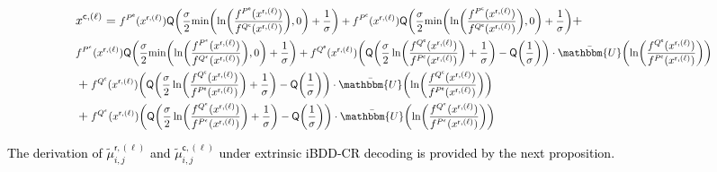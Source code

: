 \documentclass[journal]{IEEEtran}
\newcommand{\mep}{{x}}
\newcommand{\row}{\mathsf{r}}
\newcommand{\col}{\mathsf{c}}
\newcommand{\Q}{\mathsf{Q}}
\newcommand{\mut}{\tilde{\mu}}
\newcommand{\Pue}{P^{\mathsf{e}}}
\newcommand{\Que}{Q^{\mathsf{e}}}
\newcommand{\Puc}{P^{\mathsf{c}}}
\newcommand{\Quc}{Q^{\mathsf{c}}}
\newcommand{\Puep}{P^{\mathsf{\epsilon}}}
\newcommand{\Quep}{Q^{\mathsf{\epsilon}}}
\newcommand{\opt}{\tilde{l}}
\newcommand{\GL}{\textcolor{black}}
\newcommand{\GLC}[1]{\textcolor{black}{\textbf{\textit{#1}}}}
\let\originalleft\left
\let\originalright\right
\renewcommand{\left}{\mathopen{}\mathclose\bgroup\originalleft}
\renewcommand{\right}{\aftergroup\egroup\originalright}
\newcommand\scalemath[2]{\scalebox{#1}{\mbox{\ensuremath{\displaystyle #2}}}}   %
\begin{document}
\begin{figure*}[t]
	\vspace*{-20pt}
	\hrulefill		
	\begin{align}\label{xcl}
	& \nonumber \mep^{\col,(\ell)}  = \scalemath{0.85}{f^{\Pue}(\mep^{\row,(\ell)}){\Q\left( { \frac{\sigma}{2}\text{min}\left(\ln \left( \frac{f^{\Pue}(\mep^{\row,(\ell)})}{f^{\Quc}(\mep^{\row,(\ell)})}\right),0\right)+\frac{1}{\sigma}} \right) } + f^{\Puc}(\mep^{\row,(\ell)}){\Q\left( { \frac{\sigma}{2}\text{min}\left(\ln \left( \frac{f^{\Puc}(\mep^{\row,(\ell)})}{f^{\Que}(\mep^{\row,(\ell)})}\right),0\right)+\frac{1}{\sigma}} \right) }} + \\ \nonumber &  \scalemath{0.85}{f^{\Puep}(\mep^{\row,(\ell)}){\Q\left( { \frac{\sigma}{2}\text{min}\left(\ln \left(\frac{f^{\Puep}(\mep^{\row,(\ell)})}{f^{\Quep}(\mep^{\row,(\ell)})}\right),0\right)+\frac{1}{\sigma}} \right) } + f^{\Que}(\mep^{\row,(\ell)})\left( {\Q\left( { \frac{\sigma}{2}\ln \left(\frac{f^{\Que}(\mep^{\row,(\ell)})}{f^{\Puc}(\mep^{\row,(\ell)})}\right)+\frac{1}{\sigma}} \right)}-\Q\left(\frac{1}{\sigma}\right) \right) \cdot \bar{\mathbbm{U}} \left( \ln \left(\frac{f^{\Que}(\mep^{\row,(\ell)})}{f^{\Puc}(\mep^{\row,(\ell)})}\right) \right)} \\ \nonumber & + \scalemath{0.85}{f^{\Quc}(\mep^{\row,(\ell)})\left( {\Q\left( { \frac{\sigma}{2}\ln \left(\frac{f^{\Quc}(\mep^{\row,(\ell)})}{f^{\Pue}(\mep^{\row,(\ell)})}\right)+\frac{1}{\sigma}} \right)}-\Q\left(\frac{1}{\sigma}\right) \right) \cdot \bar{\mathbbm{U}} \left( \ln \left(\frac{f^{\Quc}(\mep^{\row,(\ell)})}{f^{\Pue}(\mep^{\row,(\ell)})}\right) \right)} \\  & + \scalemath{0.85}{f^{\Quep}(\mep^{\row,(\ell)})\left( {\Q\left( { \frac{\sigma}{2}\ln \left(\frac{f^{\Quep}(\mep^{\row,(\ell)})}{f^{\Puep}(\mep^{\row,(\ell)})}\right)+\frac{1}{\sigma}} \right)}-\Q\left(\frac{1}{\sigma}\right) \right) \cdot \bar{\mathbbm{U}} \left( \ln \left(\frac{f^{\Quep}(\mep^{\row,(\ell)})}{f^{\Puep}(\mep^{\row,(\ell)})}\right) \right)}
	\end{align}
	\hrulefill
\end{figure*} 
\GL{The derivation of $\mut_{i,j}^{\row,(\ell )}$ and $\mut_{i,j}^{\col,(\ell )}$ under extrinsic iBDD-CR decoding is provided by the next proposition.}
\end{document}
